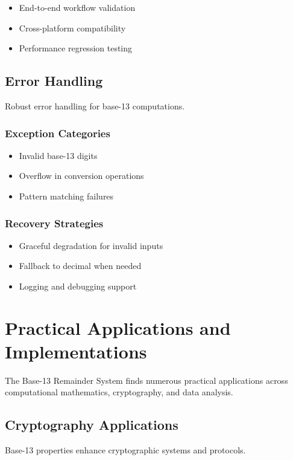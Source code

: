 \documentclass[12pt,a4paper]{report}
\begin{document}
\begin{itemize}
\item End-to-end workflow validation
\item Cross-platform compatibility
\item Performance regression testing
\end{itemize}

\section{Error Handling}

Robust error handling for base-13 computations.

\subsection{Exception Categories}

\begin{itemize}
\item Invalid base-13 digits
\item Overflow in conversion operations
\item Pattern matching failures
\end{itemize}

\subsection{Recovery Strategies}

\begin{itemize}
\item Graceful degradation for invalid inputs
\item Fallback to decimal when needed
\item Logging and debugging support
\end{itemize}

\chapter{Practical Applications and Implementations}

The Base-13 Remainder System finds numerous practical applications across computational mathematics, cryptography, and data analysis.

\section{Cryptography Applications}

Base-13 properties enhance cryptographic systems and protocols.
\end{document}
